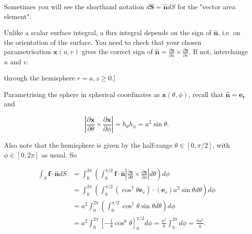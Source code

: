 \begin{definition}
  Sometimes you will see the shorthand notation \(d \boldsymbol{S}=\hat{\boldsymbol{n}} d S\) for the "vector area element".
\end{definition}

\begin{remark}
  Unlike a scalar surface integral, a flux integral depends on the sign of \(\hat{\boldsymbol{n}}\), i.e. on the orientation of the surface. You need to check that your chosen parametrisation \(\boldsymbol{x}(u, v)\) gives the correct sign of \(\hat{\boldsymbol{n}}=\frac{\partial \boldsymbol{x}}{\partial u} \times \frac{\partial \boldsymbol{x}}{\partial v}\). If not, interchange \(u\) and \(v\).
\end{remark}

\begin{example}[Example 2.8: Calculate the outward flux of \(\boldsymbol{f}(\boldsymbol{x})=\cos ^7 \boldsymbol{\theta} \boldsymbol{e}_r\) [in spherical coordinates] through the hemisphere \(r=a, z \geq 0\).]

Parametrising the sphere in spherical coordinates as \(\boldsymbol{x}(\theta, \phi)\), recall that \(\hat{\boldsymbol{n}}=\boldsymbol{e}_{\boldsymbol{r}}\) and

\[
\left|\frac{\partial \boldsymbol{x}}{\partial \theta} \times \frac{\partial \boldsymbol{x}}{\partial \phi}\right|=h_\theta h_\phi=a^2 \sin \theta .
\]

Also note that the hemisphere is given by the half-range \(\theta \in[0, \pi / 2]\), with \(\phi \in[0,2 \pi]\) as usual. So

\[
\begin{aligned}
\int_S \boldsymbol{f} \cdot \hat{\boldsymbol{n}} d S & =\int_0^{2 \pi}\left(\int_0^{\pi / 2} \boldsymbol{f} \cdot \hat{\boldsymbol{n}}\left|\frac{\partial \boldsymbol{x}}{\partial \theta} \times \frac{\partial \boldsymbol{x}}{\partial \phi}\right| d \theta\right) d \phi \\
& =\int_0^{2 \pi}\left(\int_0^{\pi / 2}\left(\cos ^7 \theta \boldsymbol{e}_r\right) \cdot\left(\boldsymbol{e}_r\right) a^2 \sin \theta d \theta\right) d \phi \\
& =a^2 \int_0^{2 \pi}\left(\int_0^{\pi / 2} \cos ^7 \theta \sin \theta d \theta\right) d \phi \\
& =a^2 \int_0^{2 \pi}\left[-\frac{1}{8} \cos ^8 \theta\right]_0^{\pi / 2} d \phi=\frac{a^2}{8} \int_0^{2 \pi} d \phi=\frac{\pi a^2}{4} .
\end{aligned}
\]
\end{example}


